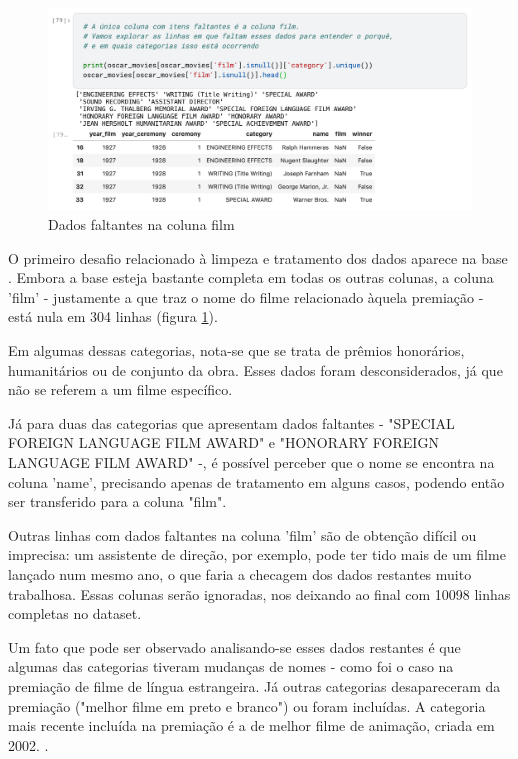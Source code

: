         \begin{figure}[htb]
        	\caption{\label{faltantes_film}Dados faltantes na coluna film}
        	\begin{center}
        		\includegraphics[scale=0.5]{faltantes_film.png}
        	\end{center}
        \end{figure}

        O primeiro desafio relacionado à limpeza e tratamento dos dados aparece na base . Embora a base esteja bastante completa em todas os outras colunas, a coluna 'film' - justamente a que traz o nome do filme relacionado àquela premiação - está nula em 304 linhas  (figura \ref{faltantes_film}).

        Em algumas dessas categorias, nota-se que se trata de prêmios honorários, humanitários ou de conjunto da obra. Esses dados foram desconsiderados, já que não se referem a um filme específico.

        Já para duas das categorias que apresentam dados faltantes - "SPECIAL FOREIGN LANGUAGE FILM AWARD"
        e "HONORARY FOREIGN LANGUAGE FILM AWARD" -, é possível perceber que o nome se encontra na coluna 'name', precisando apenas de tratamento em alguns casos, podendo então ser transferido para a coluna "film".

        Outras linhas com dados faltantes na coluna 'film' são de obtenção difícil ou imprecisa: um assistente de direção, por exemplo, pode ter tido mais de um filme lançado num mesmo ano, o que faria a checagem dos dados restantes muito trabalhosa. Essas colunas serão ignoradas, nos deixando ao final com 10098 linhas completas no dataset.

        Um fato que pode ser observado analisando-se esses dados restantes é que algumas das categorias tiveram mudanças de nomes - como foi o caso na premiação de filme de língua estrangeira. Já outras categorias desapareceram da premiação ("melhor filme em preto e branco") ou foram incluídas. A categoria mais recente incluída na premiação é a de melhor filme de animação, criada em 2002. \cite{usatoday2002}.

